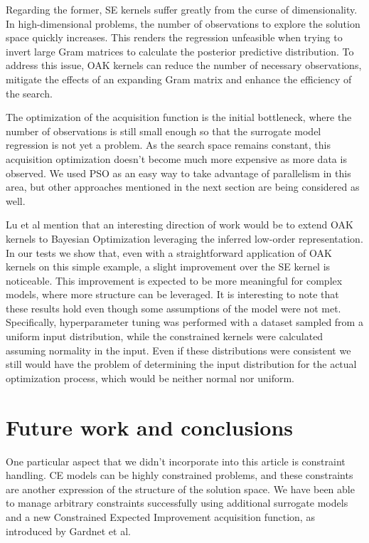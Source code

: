 \documentclass{IOS-Book-Article}
\begin{document}
	Regarding the former, SE kernels suffer greatly from the curse of dimensionality. In high-dimensional problems, the number of observations to explore the solution space quickly increases. This renders the regression unfeasible when trying to invert large Gram matrices to calculate the posterior predictive distribution. To address this issue, OAK kernels can reduce the number of necessary observations, mitigate the effects of an expanding Gram matrix and enhance the efficiency of the search.
	
	The optimization of the acquisition function is the initial bottleneck, where the number of observations is still small enough so that the surrogate model regression is not yet a problem. As the search space remains constant, this acquisition optimization doesn't become much more expensive as more data is observed. We used PSO as an easy way to take advantage of parallelism in this area, but other approaches mentioned in the next section are being considered as well\cite{acquisition-functions}.
	
	Lu et al\cite{gp-additive-orthogonal} mention that an interesting direction of work would be to extend OAK kernels to Bayesian Optimization leveraging the inferred low-order representation. In our tests we show that, even with a straightforward application of OAK kernels on this simple example, a slight improvement over the SE kernel is noticeable. This improvement is expected to be more meaningful for complex models, where more structure can be leveraged. It is interesting to note that these results hold even though some assumptions of the model were not met. Specifically, hyperparameter tuning was performed with a dataset sampled from a uniform input distribution, while the constrained kernels were calculated assuming normality in the input. Even if these distributions were consistent we still would have the problem of determining the input distribution for the actual optimization process, which would be neither normal nor uniform.
	
	
	\section{Future work and conclusions}
	One particular aspect that we didn't incorporate into this article is constraint handling. CE models can be highly constrained problems, and these constraints are another expression of the structure of the solution space. We have been able to manage arbitrary constraints successfully using additional surrogate models and a new Constrained Expected Improvement acquisition function, as introduced by Gardnet et al\cite{gp-constraints}.
	
\end{document}
